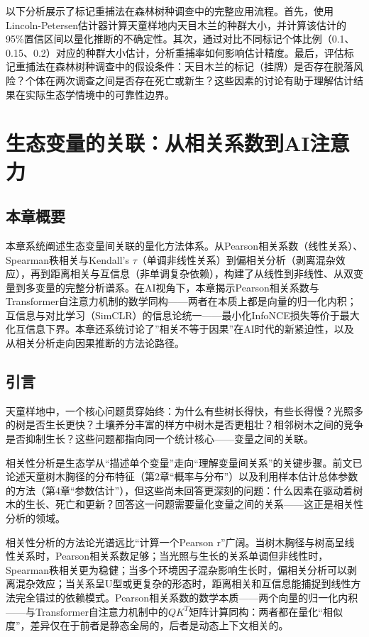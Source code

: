 \documentclass[
  twoside,12pt,fontset=none]{ctexbook}
\begin{document}
以下分析展示了标记重捕法在森林树种调查中的完整应用流程。首先，使用Lincoln-Petersen估计器计算天童样地内天目木兰的种群大小，并计算该估计的95\%置信区间以量化推断的不确定性。其次，通过对比不同标记个体比例（0.1、0.15、0.2）对应的种群大小估计，分析重捕率如何影响估计精度。最后，评估标记重捕法在森林树种调查中的假设条件：天目木兰的标记（挂牌）是否存在脱落风险？个体在两次调查之间是否存在死亡或新生？这些因素的讨论有助于理解估计结果在实际生态学情境中的可靠性边界。

\hypertarget{ch05}{%
\chapter{生态变量的关联：从相关系数到AI注意力}\label{ch05}}

\hypertarget{ux672cux7ae0ux6982ux8981-3}{%
\section{本章概要}\label{ux672cux7ae0ux6982ux8981-3}}

本章系统阐述生态变量间关联的量化方法体系。从Pearson相关系数（线性关系）、Spearman秩相关与Kendall's \(\tau\)（单调非线性关系）到偏相关分析（剥离混杂效应），再到距离相关与互信息（非单调复杂依赖），构建了从线性到非线性、从双变量到多变量的完整分析谱系。在AI视角下，本章揭示Pearson相关系数与Transformer自注意力机制的数学同构------两者在本质上都是向量的归一化内积；互信息与对比学习（SimCLR）的信息论统一------最小化InfoNCE损失等价于最大化互信息下界。本章还系统讨论了''相关不等于因果''在AI时代的新紧迫性，以及从相关分析走向因果推断的方法论路径。

\hypertarget{ux5f15ux8a00-3}{%
\section{引言}\label{ux5f15ux8a00-3}}

天童样地中，一个核心问题贯穿始终：为什么有些树长得快，有些长得慢？光照多的树是否生长更快？土壤养分丰富的样方中树木是否更粗壮？相邻树木之间的竞争是否抑制生长？这些问题都指向同一个统计核心------变量之间的关联。

相关性分析是生态学从``描述单个变量''走向``理解变量间关系''的关键步骤。前文已论述天童树木胸径的分布特征（第2章``概率与分布''）以及利用样本估计总体参数的方法（第4章``参数估计''），但这些尚未回答更深刻的问题：什么因素在驱动着树木的生长、死亡和更新？回答这一问题需要量化变量之间的关系------这正是相关性分析的领域。

相关性分析的方法论光谱远比``计算一个Pearson r''广阔。当树木胸径与树高呈线性关系时，Pearson相关系数足够；当光照与生长的关系单调但非线性时，Spearman秩相关更为稳健；当多个环境因子混杂影响生长时，偏相关分析可以剥离混杂效应；当关系呈U型或更复杂的形态时，距离相关和互信息能捕捉到线性方法完全错过的依赖模式。Pearson相关系数的数学本质------两个向量的归一化内积------与Transformer自注意力机制中的\(QK^T\)矩阵计算同构：两者都在量化``相似度''，差异仅在于前者是静态全局的，后者是动态上下文相关的。
\end{document}
